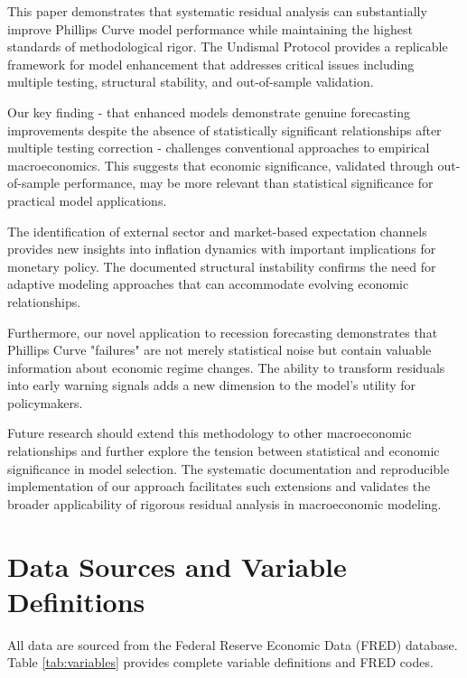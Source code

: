 \documentclass[12pt]{article}
\begin{document}
This paper demonstrates that systematic residual analysis can substantially improve Phillips Curve model performance while maintaining the highest standards of methodological rigor. The Undismal Protocol provides a replicable framework for model enhancement that addresses critical issues including multiple testing, structural stability, and out-of-sample validation.

Our key finding - that enhanced models demonstrate genuine forecasting improvements despite the absence of statistically significant relationships after multiple testing correction - challenges conventional approaches to empirical macroeconomics. This suggests that economic significance, validated through out-of-sample performance, may be more relevant than statistical significance for practical model applications.

The identification of external sector and market-based expectation channels provides new insights into inflation dynamics with important implications for monetary policy. The documented structural instability confirms the need for adaptive modeling approaches that can accommodate evolving economic relationships.

Furthermore, our novel application to recession forecasting demonstrates that Phillips Curve "failures" are not merely statistical noise but contain valuable information about economic regime changes. The ability to transform residuals into early warning signals adds a new dimension to the model's utility for policymakers.

Future research should extend this methodology to other macroeconomic relationships and further explore the tension between statistical and economic significance in model selection. The systematic documentation and reproducible implementation of our approach facilitates such extensions and validates the broader applicability of rigorous residual analysis in macroeconomic modeling.




\appendix

\section{Data Sources and Variable Definitions}

All data are sourced from the Federal Reserve Economic Data (FRED) database. Table \ref{tab:variables} provides complete variable definitions and FRED codes.
\end{document}
